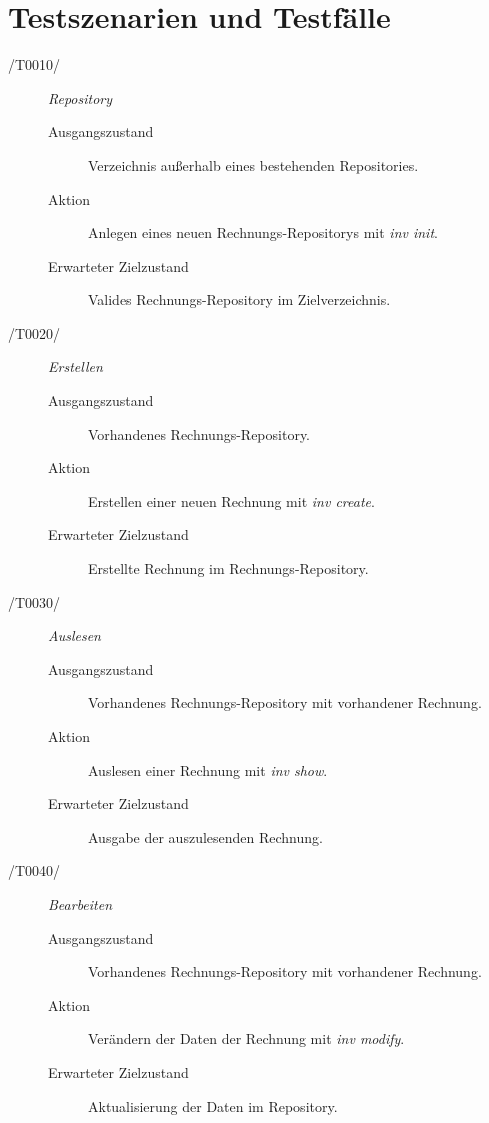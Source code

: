 
\section{Testszenarien und Testfälle}



\begin{description}
  \item[/T0010/]
	\textit{Repository}
	\begin{description}
		\item[Ausgangszustand]
		Verzeichnis außerhalb eines bestehenden Repositories.
		\item[Aktion]
		Anlegen eines neuen Rechnungs-Repositorys mit \textit{inv init}.
		\item[Erwarteter Zielzustand]
		Valides Rechnungs-Repository im Zielverzeichnis.
	\end{description}

  \item[/T0020/]
	\textit{Erstellen}
	\begin{description}
		\item[Ausgangszustand]
		Vorhandenes Rechnungs-Repository.
		\item[Aktion]
		Erstellen einer neuen Rechnung mit \textit{inv create}.
		\item[Erwarteter Zielzustand]
		Erstellte Rechnung im Rechnungs-Repository.
	\end{description}

  \item[/T0030/]
	\textit{Auslesen}
	\begin{description}
		\item[Ausgangszustand]
		Vorhandenes Rechnungs-Repository mit vorhandener Rechnung.
		\item[Aktion]
		Auslesen einer Rechnung mit \textit{inv show}.
		\item[Erwarteter Zielzustand]
		Ausgabe der auszulesenden Rechnung.
	\end{description}

  \item[/T0040/]
	\textit{Bearbeiten}
	\begin{description}
		\item[Ausgangszustand]
		Vorhandenes Rechnungs-Repository mit vorhandener Rechnung.
		\item[Aktion]
		Verändern der Daten der Rechnung mit \textit{inv modify}.
		\item[Erwarteter Zielzustand]
		Aktualisierung der Daten im Repository.
	\end{description}


\end{description}
